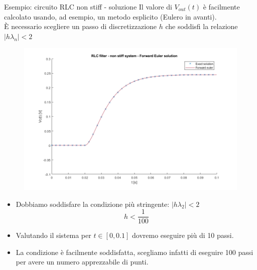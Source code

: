 \documentclass[aspectratio=169, 10pt, handout,usenames,dvipsnames]{beamer}
\begin{document}
\begin{frame}{Esempio: circuito RLC \alert{non} stiff - soluzione}
Il valore di \( V_{out}(t) \) è facilmente calcolato usando, ad esempio, un metodo esplicito (Eulero in avanti).\\ \medskip
È necessario scegliere un passo di discretizzazione $h$ che soddisfi la relazione $|h \lambda_n| < 2$\\     \bigskip    
    \begin{multicols}{2}
        \begin{figure}
       \centering        \includegraphics[width=1\linewidth]{rlc_non_stiff_forward_euler.png}
        \label{fig:my_label}
        \end{figure}
    \columnbreak
    \begin{itemize}
    \item Dobbiamo soddisfare la condizione più stringente: $|h \lambda_2| < 2$
    \[
    h < \dfrac{1}{100}
    \]
    \item Valutando il sistema per $t\in [0,0.1]$ dovremo eseguire \alert{più di 10 passi}.
    \item La condizione è facilmente soddisfatta, scegliamo infatti di eseguire 100 passi per avere un numero apprezzabile di punti.
    \end{itemize}
    \end{multicols}

\end{frame}
\end{document}

